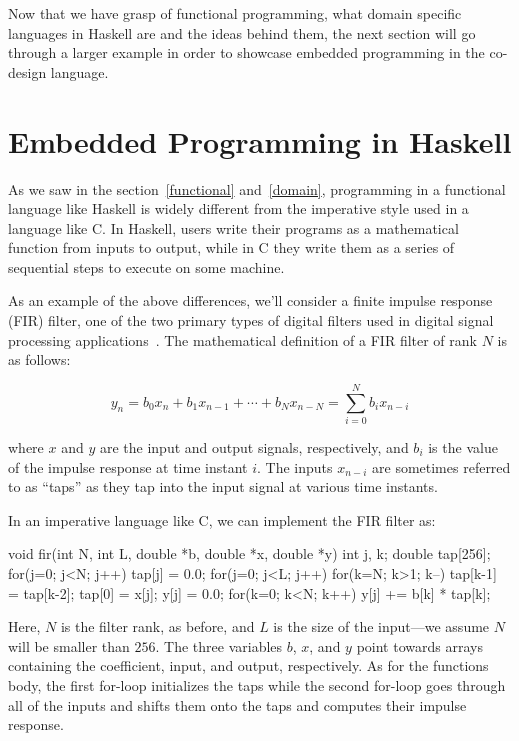 \documentclass[../paper.tex]{subfiles}
\begin{document}
Now that we have grasp of functional programming, what domain specific languages in Haskell are and the ideas behind them, the next section will go through a larger example in order to showcase embedded programming in the co-design language.

\section{Embedded Programming in Haskell}
\label{embedded}

As we saw in the section~\ref{functional} and~\ref{domain}, programming in a functional language like Haskell is widely different from the imperative style used in a language like C. In Haskell, users write their programs as a mathematical function from inputs to output, while in C they write them as a series of sequential steps to execute on some machine.

As an example of the above differences, we'll consider a finite impulse response (FIR) filter, one of the two primary types of digital filters used in digital signal processing applications~\cite{oppenheim1989}. The mathematical definition of a FIR filter of rank $N$ is as follows:

\begin{equation}
y_{n} = b_{0} x_{n} + b_{1} x_{n-1} + \cdots + b_{N} x_{n-N} = \sum_{i=0}^{N} b_{i} x_{n-i}
\end{equation}
\vspace{1mm}

\noindent where $x$ and $y$ are the input and output signals, respectively, and $b_i$ is the value of the impulse response at time instant $i$. The inputs $x_{n-i}$ are sometimes referred to as ``taps'' as they tap into the input signal at various time instants. 

In an imperative language like C, we can implement the FIR filter as:

\begin{code}
void fir(int N, int L, double *b, double *x, double *y) {
 int j, k;
 double tap[256];
 for(j=0; j<N; j++) tap[j] = 0.0;
 for(j=0; j<L; j++) {
  for(k=N; k>1; k--) tap[k-1] = tap[k-2];
  tap[0] = x[j];
  y[j] = 0.0;
  for(k=0; k<N; k++) y[j] += b[k] * tap[k];
 }
}
\end{code}

\noindent Here, $N$ is the filter rank, as before, and $L$ is the size of the input---we assume $N$ will be smaller than $256$. The three variables $b$, $x$, and $y$ point towards arrays containing the coefficient, input, and output, respectively. As for the functions body, the first for-loop initializes the taps while the second for-loop goes through all of the inputs and shifts them onto the taps and computes their impulse response.
\end{document}
